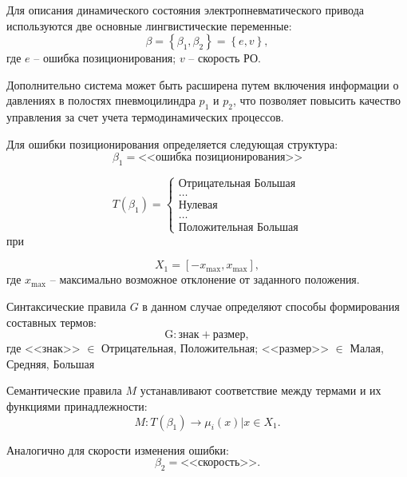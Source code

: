 Для описания динамического состояния электропневматического привода
используются две основные лингвистические переменные:
\begin{equation*}
	\beta = \left\{\beta_1, \beta_2\right\} = \left\{e, v\right\},
\end{equation*}
где $e$ -- ошибка позиционирования;
$v$ -- скорость РО.

Дополнительно система может быть расширена путем включения информации о
давлениях в полостях пневмоцилиндра $p_1$ и $p_2$, что позволяет повысить
качество управления за счет учета термодинамических процессов.

Для ошибки позиционирования определяется следующая структура:
\begin{equation*}
	\beta_1 = \text{<<ошибка позиционирования>>}
\end{equation*}

\begin{equation*}
	T(\beta_1) =\begin{cases}
		\text{Отрицательная Большая} \\
		\ldots                       \\
		\text{Нулевая}               \\
		\ldots                       \\
		\text{Положительная Большая}
	\end{cases}
\end{equation*}
при

\begin{equation*}
	X_1 = [-x_{\text{max}}, x_{\text{max}}],
\end{equation*}
где $x_{\text{max}}$ -- максимально возможное отклонение от заданного положения.

Синтаксические правила $G$ в данном случае определяют способы формирования составных термов:
\begin{equation*}
	\text{G}: \text{знак} + \text{размер},
\end{equation*}
где <<знак>> $\in$ {Отрицательная, Положительная}; <<размер>> $\in$ {Малая, Средняя, Большая}

Семантические правила $M$ устанавливают соответствие между термами и их функциями принадлежности:
\begin{equation*}
	M: T(\beta_1) \rightarrow {\mu_i(x) | x \in X_1}.
\end{equation*}

Аналогично для скорости изменения ошибки:
\begin{equation*}
	\beta_2 = \text{<<скорость>>}.
\end{equation*}

